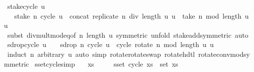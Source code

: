 \begin{isabellebody}
\endisatagproof
{\isafoldproof}%
%
\isadelimproof
\isanewline
%
\endisadelimproof
\isanewline
{}\isamarkupfalse%
\ stake{\isacharunderscore}cycle{\isacharcolon}\ {\isachardoublequoteopen}u\ {\isasymnoteq}\ {\isacharbrackleft}{\isacharbrackright}\ {\isasymLongrightarrow}\isanewline
\ \ \ stake\ n\ {\isacharparenleft}cycle\ u{\isacharparenright}\ {\isacharequal}\ concat\ {\isacharparenleft}replicate\ {\isacharparenleft}n\ div\ length\ u{\isacharparenright}\ u{\isacharparenright}\ {\isacharat}\ take\ {\isacharparenleft}n\ mod\ length\ u{\isacharparenright}\ u{\isachardoublequoteclose}\isanewline
%
\isadelimproof
\ \ %
\endisadelimproof
%
\isatagproof
{}\isamarkupfalse%
\ {\isacharparenleft}subst\ div{\isacharunderscore}mult{\isacharunderscore}mod{\isacharunderscore}eq{\isacharbrackleft}of\ n\ {\isachardoublequoteopen}length\ u{\isachardoublequoteclose}{\isacharcomma}\ symmetric{\isacharbrackright}{\isacharcomma}\ unfold\ stake{\isacharunderscore}add{\isacharbrackleft}symmetric{\isacharbrackright}{\isacharparenright}\ auto%
\endisatagproof
{\isafoldproof}%
%
\isadelimproof
\isanewline
%
\endisadelimproof
\isanewline
{}\isamarkupfalse%
\ sdrop{\isacharunderscore}cycle{\isacharcolon}\ {\isachardoublequoteopen}u\ {\isasymnoteq}\ {\isacharbrackleft}{\isacharbrackright}\ {\isasymLongrightarrow}\ sdrop\ n\ {\isacharparenleft}cycle\ u{\isacharparenright}\ {\isacharequal}\ cycle\ {\isacharparenleft}rotate\ {\isacharparenleft}n\ mod\ length\ u{\isacharparenright}\ u{\isacharparenright}{\isachardoublequoteclose}\isanewline
%
\isadelimproof
\ \ %
\endisadelimproof
%
\isatagproof
{}\isamarkupfalse%
\ {\isacharparenleft}induct\ n\ arbitrary{\isacharcolon}\ u{\isacharparenright}\ {\isacharparenleft}auto\ simp{\isacharcolon}\ rotate{}{\isacharunderscore}rotate{\isacharunderscore}swap\ rotate{}{\isacharunderscore}hd{\isacharunderscore}tl\ rotate{\isacharunderscore}conv{\isacharunderscore}mod{\isacharbrackleft}symmetric{\isacharbrackright}{\isacharparenright}%
\endisatagproof
{\isafoldproof}%
%
\isadelimproof
\isanewline
%
\endisadelimproof
\isanewline
{}\isamarkupfalse%
\ sset{\isacharunderscore}cycle{\isacharbrackleft}simp{\isacharbrackright}{\isacharcolon}\isanewline
\ \ \ {\isachardoublequoteopen}xs\ {\isasymnoteq}\ {\isacharbrackleft}{\isacharbrackright}{\isachardoublequoteclose}\isanewline
\ \ \ {\isachardoublequoteopen}sset\ {\isacharparenleft}cycle\ xs{\isacharparenright}\ {\isacharequal}\ set\ xs{\isachardoublequoteclose}\isanewline

\end{isabellebody}
